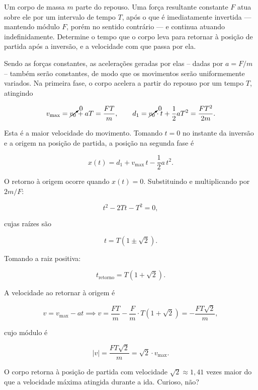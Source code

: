 \begin{exemplo}\label{exemplo_dinamica1_eq_dinamica1_segundaleinewtonex03}

Um corpo de massa $m$ parte do repouso. Uma força resultante constante $F$ atua sobre
ele por um intervalo de tempo $T$, após o que é imediatamente invertida --- mantendo
módulo $F$, porém no sentido contrário --- e continua atuando indefinidamente. Determine
o tempo que o corpo leva para retornar à posição de partida após a inversão, e a
velocidade com que passa por ela.



\resolucao

Sendo as forças constantes, as acelerações geradas por elas -- dadas por $a = F/m$ -- também serão constantes, de modo que os movimentos serão uniformemente variados. Na primeira fase, o corpo acelera a partir do repouso por um tempo $T$, atingindo

$$ v_{\max} = \cancelto{0}{v_0} + aT = \frac{FT}{m}, \qquad d_1 = \cancelto{0}{v_0} \cdot t  + \frac{1}{2}aT^2 = \frac{FT^2}{2m}. $$

Esta é a maior velocidade do movimento. Tomando $t = 0$ no instante da inversão e a
origem na posição de partida, a posição na segunda fase é

$$ x(t) = d_1 + v_{\max}\,t - \frac{1}{2}a\,t^2. $$

O retorno à origem ocorre quando $x(t) = 0$. Substituindo e multiplicando por $2m/F$:

$$ t^2 - 2Tt - T^2 = 0, $$

\noindent cujas raízes são

$$ t = T\!\left(1 \pm \sqrt{2}\right). $$

Tomando a raiz positiva:

$$ \boxed{t_{\text{retorno}} = T\!\left(1 + \sqrt{2}\right).} $$

A velocidade ao retornar à origem é

$$v = v_\text{max} - at \implies  v = \frac{FT}{m} - \frac{F}{m}\cdot T\!\left(1+\sqrt{2}\right)
     = -\frac{FT\sqrt{2}}{m}, $$

\noindent cujo módulo é

$$ \boxed{|v| = \frac{FT\sqrt{2}}{m} = \sqrt{2}\cdot v_{\max}.} $$

O corpo retorna à posição de partida com velocidade $\sqrt{2} \approx 1{,}41$ vezes
maior do que a velocidade máxima atingida durante a ida. Curioso, não?




\end{exemplo}

